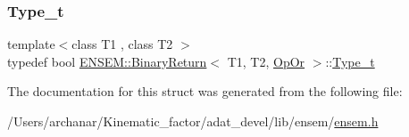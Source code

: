 \mbox{\label{structENSEM_1_1BinaryReturn_3_01T1_00_01T2_00_01OpOr_01_4_acabcdd16b12fa1840e7408d6b811491e}} 
\subsubsection{\texorpdfstring{Type\_t}{Type\_t}\hspace{0.1cm}{\footnotesize\ttfamily [2/2]}}
{\footnotesize\ttfamily template$<$class T1 , class T2 $>$ \\
typedef bool \mbox{\hyperlink{structENSEM_1_1BinaryReturn}{E\+N\+S\+E\+M\+::\+Binary\+Return}}$<$ T1, T2, \mbox{\hyperlink{structENSEM_1_1OpOr}{Op\+Or}} $>$\+::\mbox{\hyperlink{structENSEM_1_1BinaryReturn_3_01T1_00_01T2_00_01OpOr_01_4_acabcdd16b12fa1840e7408d6b811491e}{Type\+\_\+t}}}



The documentation for this struct was generated from the following file\+:\begin{DoxyCompactItemize}
\item 
/\+Users/archanar/\+Kinematic\+\_\+factor/adat\+\_\+devel/lib/ensem/\mbox{\hyperlink{lib_2ensem_2ensem_8h}{ensem.\+h}}\end{DoxyCompactItemize}

